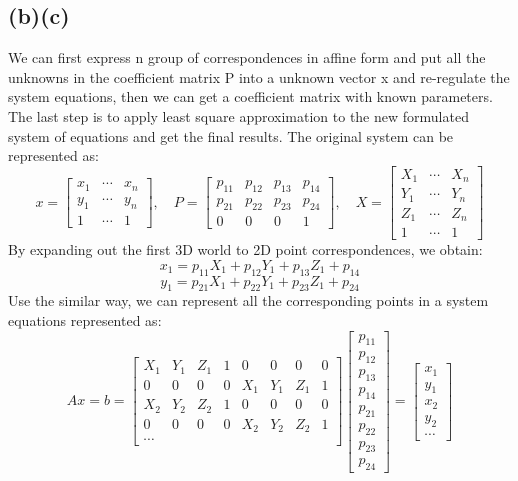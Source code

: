 \documentclass[letterpaper]{article}
\begin{document}
\subsection*{(b)(c)}
We can first express n group of correspondences in affine form and put all the unknowns in the coefficient matrix P into a unknown vector x and re-regulate the system equations, then we can get a coefficient matrix with known parameters. The last step is to apply least square approximation to the new formulated system of equations and get the final results. The original system can be represented as:
$$
x = 
\begin{bmatrix}
x_1 & \cdots & x_n\\
y_1 & \cdots & y_n\\
1 & \cdots & 1
\end{bmatrix},\quad
P = 
\begin{bmatrix}
p_{11} & p_{12} & p_{13} & p_{14}\\
p_{21} & p_{22} & p_{23} & p_{24}\\
0 & 0 & 0 & 1
\end{bmatrix},\quad
X = 
\begin{bmatrix}
X_1 & \cdots & X_n\\
Y_1 & \cdots & Y_n\\
Z_1 & \cdots & Z_n\\
1 & \cdots & 1
\end{bmatrix}
$$
By expanding out the first 3D world to 2D point correspondences, we obtain:
\[x_{1} = p_{11} X_{1} + p_{12} Y_{1} + p_{13} Z_{1}  + p_{14}   \]
\[y_{1} = p_{21} X_{1} + p_{22} Y_{1} + p_{23} Z_{1}  + p_{24}   \]
Use the similar way, we can represent all the corresponding points in a system equations represented as:
$$Ax = b = 
\begin{bmatrix}
X_1 & Y_1 & Z_1 & 1 & 0 & 0 & 0 & 0\\
0 & 0 & 0 & 0 & X_1 & Y_1 & Z_1 & 1\\
X_2 & Y_2 & Z_2 & 1 & 0 & 0 & 0 & 0\\
0 & 0 & 0 & 0 & X_2 & Y_2 & Z_2 & 1\\
\cdots & & &
\end{bmatrix}
\begin{bmatrix}
p_{11}\\
p_{12}\\
p_{13}\\
p_{14}\\
p_{21}\\
p_{22}\\
p_{23}\\
p_{24}
\end{bmatrix} = 
\begin{bmatrix}
x_1\\
y_1\\
x_2\\
y_2\\
\cdots
\end{bmatrix}
$$
\end{document}
